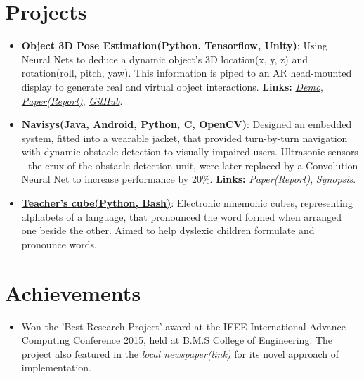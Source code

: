 \documentclass[letterpaper,11pt]{article}
\newcommand{\resumeItem}[2]{
  \item\small{
    \textbf{#1}{: #2 \vspace{-2pt}}
  }
}
\newcommand{\resumePoint}[1]{
  \item\small{#1}
}
\newcommand{\resumeSubItem}[2]{\resumeItem{#1}{#2}\vspace{-4pt}}
\newcommand{\resumeSubHeadingListStart}{\begin{itemize}[leftmargin=*]}
\newcommand{\resumeSubHeadingListEnd}{\end{itemize}\vspace{-10pt}}
\begin{document}
%

\section{Projects}
  \resumeSubHeadingListStart
    \resumeSubItem{Object 3D Pose Estimation(Python, Tensorflow, Unity)}
      {Using Neural Nets to deduce a dynamic object\rq s 3D location(x, y, z) and rotation(roll, pitch, yaw). This information is piped to an AR head-mounted display to generate real and virtual object interactions. \textbf{Links:}
      \href{https://drive.google.com/file/d/1kCepKQxR73tUTLuvmd1YL3sIbj1GxDdc/view?usp=sharing}{\textit{Demo}}, \href{https://drive.google.com/file/d/1mRwSJ8p2-g-gtBGl1A8seRB8SojWQphm/view?usp=sharing}{\textit{Paper(Report)}}, \href{https://github.com/nikhilsu/Object-location-detection}{\textit{GitHub}}.}
    \resumeSubItem{Navisys(Java, Android, Python, C, OpenCV)}
      {Designed an embedded system, fitted into a wearable jacket, that provided turn-by-turn navigation with dynamic obstacle detection to visually impaired users. Ultrasonic sensors - the crux of the obstacle detection unit, were later replaced by a Convolution Neural Net to increase performance by 20\%. \textbf{Links:}
      \href{https://drive.google.com/file/d/1bFHeZ7-7uwZ0spir3YQ7r0maWdLteEtu/view?usp=sharing}{\textit{Paper(Report)}},
      \href{https://drive.google.com/file/d/1JWB67U2jjTG7cXZFVjRPVGKsv-rRhgUQ/view?usp=sharing}{\textit{Synopsis}}.}
    \resumeSubItem{\href{https://www.dropbox.com/s/grnct56cpmsiw6c/20160208_234825.mp4?dl=0}{Teacher\rq s cube(Python, Bash)}}
      {Electronic mnemonic cubes, representing alphabets of a language, that pronounced the word formed when arranged one beside the other. Aimed to help dyslexic children formulate and pronounce words.}
    \resumeSubHeadingListEnd

\section{Achievements}
  \resumeSubHeadingListStart
    \resumePoint{Won the 'Best Research Project' award at the IEEE International Advance Computing Conference 2015, held at B.M.S College of Engineering. The project also featured in the \href{https://drive.google.com/open?id=0B0vNhKZyi8qyam1fQ3lfaE1hMkE}{\emph{local newspaper(link)}} for its novel approach of implementation.}
  \resumeSubHeadingListEnd
\end{document}
